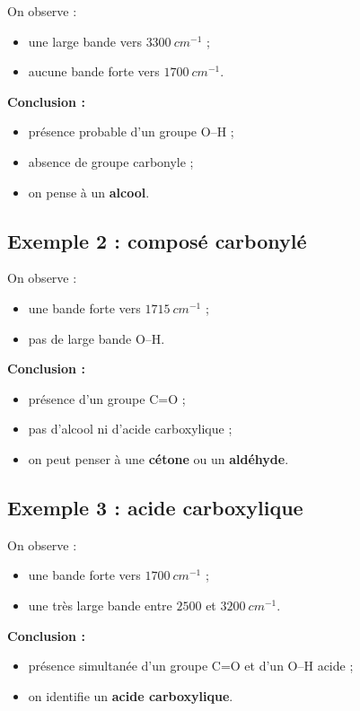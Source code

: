 \documentclass[11pt,a4paper]{article}
\begin{document}
On observe :
\begin{itemize}
    \item une large bande vers \(3300\ \si{cm^{-1}}\) ;
    \item aucune bande forte vers \(1700\ \si{cm^{-1}}\).
\end{itemize}

\textbf{Conclusion :}
\begin{itemize}
    \item présence probable d’un groupe O--H ;
    \item absence de groupe carbonyle ;
    \item on pense à un \textbf{alcool}.
\end{itemize}

\subsection{Exemple 2 : composé carbonylé}

On observe :
\begin{itemize}
    \item une bande forte vers \(1715\ \si{cm^{-1}}\) ;
    \item pas de large bande O--H.
\end{itemize}

\textbf{Conclusion :}
\begin{itemize}
    \item présence d’un groupe C=O ;
    \item pas d’alcool ni d’acide carboxylique ;
    \item on peut penser à une \textbf{cétone} ou un \textbf{aldéhyde}.
\end{itemize}

\subsection{Exemple 3 : acide carboxylique}

On observe :
\begin{itemize}
    \item une bande forte vers \(1700\ \si{cm^{-1}}\) ;
    \item une très large bande entre \(2500\) et \(3200\ \si{cm^{-1}}\).
\end{itemize}

\textbf{Conclusion :}
\begin{itemize}
    \item présence simultanée d’un groupe C=O et d’un O--H acide ;
    \item on identifie un \textbf{acide carboxylique}.
\end{itemize}
\end{document}
